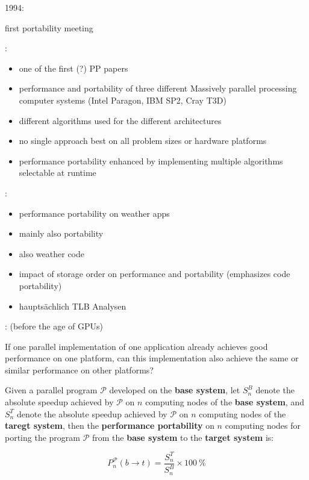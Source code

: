 1994: \citet{hey_portability_1994}

first portability meeting


: \citet{foster_performance_1996}

\begin{itemize}
    \item one of the first (?) PP papers
    \item performance and portability of three different Massively parallel processing computer systems (Intel Paragon, IBM SP2, Cray T3D)
    \item different algorithms used for the different architectures
    \item no single approach best on all problem sizes or hardware platforms
    \item performance portability enhanced by implementing multiple algorithms selectable at runtime
\end{itemize}


: \citet{michalakes_performance-portability_2001}

\begin{itemize}
    \item performance portability on weather apps
    \item mainly also portability
    \item also weather code
    \item impact of storage order on performance and portability (emphasizes code portability)
    \item hauptsächlich TLB Analysen
\end{itemize}


: \cite{zhu_performance_2007} (before the age of GPUs)

\begin{quotebox}{\citet{zhu_performance_2007}}
    If one parallel implementation of one application already achieves good performance on one platform, can this implementation also achieve the same or similar performance on other platforms?
\end{quotebox}

\begin{definition}
Given a parallel program $\mathcal{P}$ developed on the \textbf{base system}, let $S^B_n$ denote the absolute speedup achieved by $\mathcal{P}$ on $n$ computing nodes of the \textbf{base system}, and $S^T_n$ denote the absolute speedup achieved by $\mathcal{P}$ on $n$ computing nodes of the \textbf{taregt system}, then the \textbf{performance portability} on $n$ computing nodes for porting the program $\mathcal{P}$ from the \textbf{base system} to the \textbf{target system} is:

$$P^\mathcal{P}_n(b \rightarrow t) = \frac{S^T_n}{S^B_n} \times \SI{100}{\percent}$$
\end{definition}

